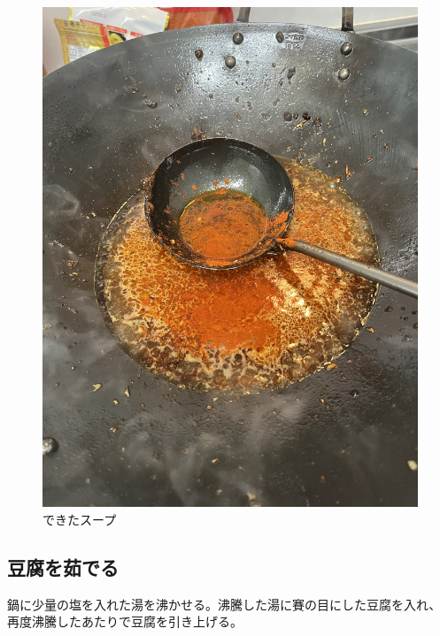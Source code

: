 \documentclass[a4paper,10pt,xelatex,ja=standard,twocolumn]{bxjsarticle}
\begin{document}
\begin{figure}[h]
  \caption{できたスープ}
  \label{tofu}
  \begin{center}
    \includegraphics[height=\linewidth]{IMG_4082.jpg}
  \end{center}
\end{figure}

\subsection{豆腐を茹でる}

鍋に少量の塩を入れた湯を沸かせる。沸騰した湯に賽の目にした豆腐を入れ、再度沸騰したあたりで豆腐を引き上げる。
\end{document}
